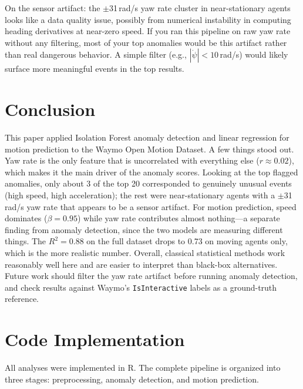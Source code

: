 \documentclass[conference]{IEEEtran}
\begin{document}
On the sensor artifact: the $\pm$31\,rad/s yaw rate cluster in near-stationary agents looks like a data quality issue, possibly from numerical instability in computing heading derivatives at near-zero speed. If you ran this pipeline on raw yaw rate without any filtering, most of your top anomalies would be this artifact rather than real dangerous behavior. A simple filter (e.g., $|\dot{\psi}| < 10$\,rad/s) would likely surface more meaningful events in the top results.

\section{Conclusion}

This paper applied Isolation Forest anomaly detection and linear regression for motion prediction to the Waymo Open Motion Dataset. A few things stood out. Yaw rate is the only feature that is uncorrelated with everything else ($r \approx 0.02$), which makes it the main driver of the anomaly scores. Looking at the top flagged anomalies, only about 3 of the top 20 corresponded to genuinely unusual events (high speed, high acceleration); the rest were near-stationary agents with a $\pm$31\,rad/s yaw rate that appears to be a sensor artifact. For motion prediction, speed dominates ($\beta = 0.95$) while yaw rate contributes almost nothing---a separate finding from anomaly detection, since the two models are measuring different things. The $R^2 = 0.88$ on the full dataset drops to 0.73 on moving agents only, which is the more realistic number. Overall, classical statistical methods work reasonably well here and are easier to interpret than black-box alternatives. Future work should filter the yaw rate artifact before running anomaly detection, and check results against Waymo's \texttt{IsInteractive} labels as a ground-truth reference.

\section{Code Implementation}

All analyses were implemented in R. The complete pipeline is organized into three stages: preprocessing, anomaly detection, and motion prediction.
\end{document}
